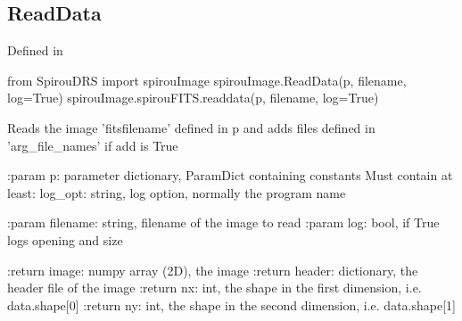 
\noindent\begin{minipage}{\textwidth}
\subsection{ReadData}

Defined in \spirouImage{}

\begin{pythonbox}
from SpirouDRS import spirouImage
spirouImage.ReadData(p, filename, log=True)
spirouImage.spirouFITS.readdata(p, filename, log=True)
\end{pythonbox}

\begin{pythondocstring}
Reads the image 'fitsfilename' defined in p and adds files defined in
'arg_file_names' if add is True

:param p: parameter dictionary, ParamDict containing constants
    Must contain at least:
            log_opt: string, log option, normally the program name

:param filename: string, filename of the image to read
:param log: bool, if True logs opening and size

:return image: numpy array (2D), the image
:return header: dictionary, the header file of the image
:return nx: int, the shape in the first dimension, i.e. data.shape[0]
:return ny: int, the shape in the second dimension, i.e. data.shape[1]
\end{pythondocstring}
\end{minipage}


